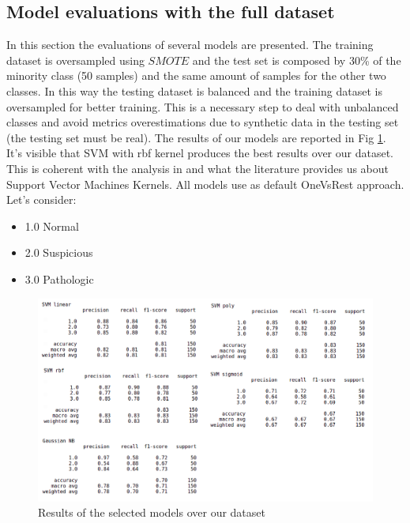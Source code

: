 \documentclass[a4paper,12pt]{article}
\begin{document}
\newpage
\subsection{Model evaluations with the full dataset}

In this section the evaluations of several models are presented. The training dataset is oversampled using $SMOTE$ \cite{smote} and the test set is composed by 30\% of the minority class (50 samples) and the same amount of samples for the other two classes. In this way the testing dataset is balanced and the training dataset is oversampled for better training. This is a necessary step to deal with unbalanced classes and avoid metrics overestimations due to synthetic data in the testing set (the testing set must be real). 
The results of our models are reported in Fig \ref{fig:fulldataset}. It's visible that SVM with rbf kernel produces the best results over our dataset. This is coherent with the analysis in \cite{ml} and what the literature provides us about Support Vector Machines Kernels. All models use as default OneVsRest approach. Let's consider:
\begin{itemize}
  \item 1.0 Normal
  \item 2.0 Suspicious
  \item 3.0 Pathologic
\end{itemize}
\bigbreak
\begin{figure}[H]
  \begin{center}
  \includegraphics[width=1.0\textwidth]{images/fulldataset.png}
  \end{center}
  \caption{Results of the selected models over our dataset}
  \label{fig:fulldataset}
\end{figure}
\end{document}
